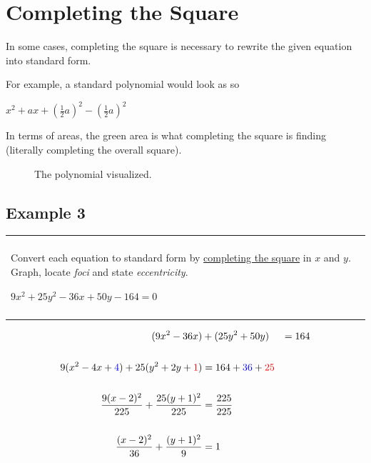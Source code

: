 \documentclass{article}
\newenvironment{question}
  {\begin{center}
  \begin{tabular}{|p{0.9\textwidth}|}
  \hline\\
  }
  {
  \\\\\hline
  \end{tabular}
  \end{center}
  }
\begin{document}
\newpage
\section{Completing the Square}

In some cases, completing the square is necessary to rewrite the given equation into standard form.

For example, a standard polynomial would look as so
\begin{center}
  $x^2 + ax + (\frac{1}{2}a)^2 - (\frac{1}{2}a)^2$
\end{center}
In terms of areas, the green area is what completing the square is finding (literally completing the overall square).
\begin{figure}[H]
  \begin{center}
  \end{center}
  \caption{The polynomial visualized.}
  \label{fig:completingsquare}
\end{figure}

\subsection{Example 3}
\begin{question}
  Convert each equation to standard form by \underline{completing the square} in $x$ and $y$. Graph, locate \textit{foci} and state \textit{eccentricity}.
  \begin{center}
    $9x^2 + 25y^2 - 36x + 50y - 164 = 0$
  \end{center}
\end{question}
\begin{align*}
  (9x^2 - 36x) &+ (25y^2 + 50y) &= 164\\\\
  9(x^2 - 4x + \textcolor{blue}{4}) + 25(y^2 + 2y + \textcolor{red}{1}) &= 164 + \textcolor{blue}{36} + \textcolor{red}{25}\\\\
  \frac{9(x - 2)^2}{225} +\frac{25(y + 1)^2}{225} &= \frac{225}{225}\\\\
  \frac{(x - 2)^2}{36} + \frac{(y + 1)^2}{9} &= 1
\end{align*}
\end{document}
